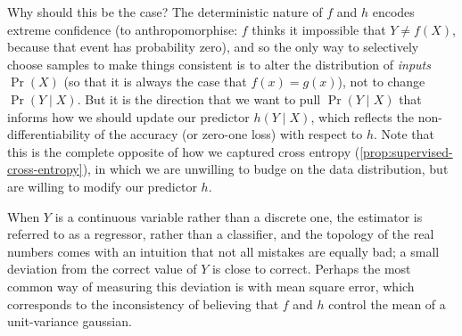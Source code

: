 \documentclass[twoside]{article}
\theoremstyle{plain}
\newtheorem{prop}[theorem]{Proposition}
\theoremstyle{definition}
\begin{document}
Why should this be the case? The deterministic nature of $f$ and $h$ encodes extreme confidence (to anthropomorphise: $f$ thinks it impossible that $Y \ne f(X)$, because that event has probability zero), and so the only way to selectively choose samples to make things consistent is to alter the distribution of \emph{inputs} $\Pr(X)$ (so that it is always the case that $f(x) = g(x)$), not to change $\Pr(Y \mid X)$.
But it is the direction that we want to pull $\Pr(Y\mid X)$ that informs how we should update our predictor $h(Y \mid X)$, which reflects the non-differentiability of the accuracy (or zero-one loss) with respect to $h$.
Note that this is the complete opposite of how we captured cross entropy (\cref{prop:supervised-cross-entropy}), in which we are unwilling to budge on the data distribution, but are willing to modify our predictor $h$.





When $Y$ is a continuous variable rather than a discrete one, the estimator is referred to as a regressor, rather than a classifier, and the topology of the real numbers comes with an intuition that not all mistakes are equally bad; a small deviation from the correct value of $Y$ is close to correct.
Perhaps the most common way of measuring this deviation is with mean square error, which corresponds to the inconsistency of believing that $f$ and $h$ control the mean of a unit-variance gaussian.
\end{document}
